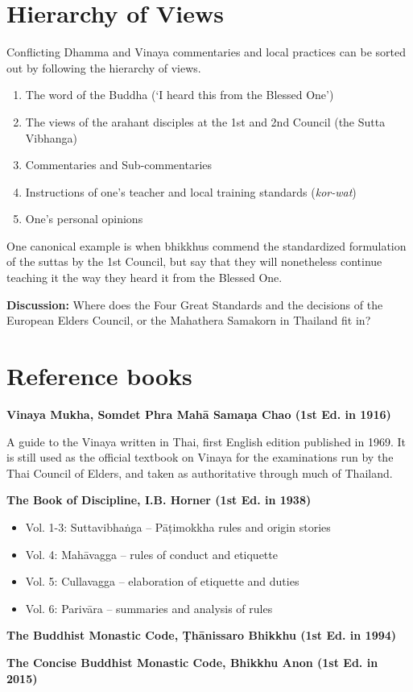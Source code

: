 \section{Hierarchy of Views}

Conflicting Dhamma and Vinaya commentaries and local practices can be
sorted out by following the hierarchy of views.

\begin{enumerate}
\def\labelenumi{\arabic{enumi}.}
\tightlist
\item
  The word of the Buddha (`I heard this from the Blessed One')
\item
  The views of the arahant disciples at the 1st and 2nd Council (the
  Sutta Vibhanga)
\item
  Commentaries and Sub-commentaries
\item
  Instructions of one's teacher and local training standards
  (\emph{kor-wat})
\item
  One's personal opinions
\end{enumerate}

One canonical example is when bhikkhus commend the standardized
formulation of the suttas by the 1st Council, but say that they will
nonetheless continue teaching it the way they heard it from the Blessed
One.

\textbf{Discussion:} Where does the Four Great Standards and the
decisions of the European Elders Council, or the Mahathera Samakorn in
Thailand fit in?

\section{Reference books}

\textbf{Vinaya Mukha, Somdet Phra Mahā Samaṇa Chao (1st Ed. in 1916)}

A guide to the Vinaya written in Thai, first English edition published
in 1969. It is still used as the official textbook on Vinaya for the
examinations run by the Thai Council of Elders, and taken as
authoritative through much of Thailand.

\textbf{The Book of Discipline, I.B. Horner (1st Ed. in 1938)}

\begin{itemize}
\tightlist
\item
  Vol. 1-3: Suttavibhaṅga -- Pāṭimokkha rules and origin stories
\item
  Vol. 4: Mahāvagga -- rules of conduct and etiquette
\item
  Vol. 5: Cullavagga -- elaboration of etiquette and duties
\item
  Vol. 6: Parivāra -- summaries and analysis of rules
\end{itemize}

\enlargethispage*{\baselineskip}

\textbf{The Buddhist Monastic Code, Ṭhānissaro Bhikkhu (1st Ed. in
1994)}

\textbf{The Concise Buddhist Monastic Code, Bhikkhu Anon (1st Ed. in
2015)}

